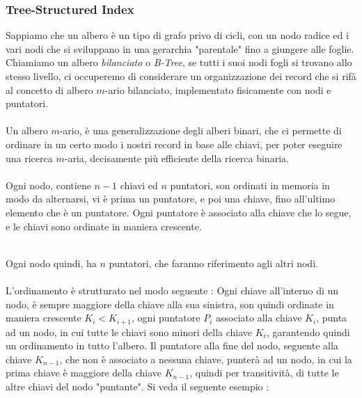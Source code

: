 \documentclass[12pt, letterpaper]{article}
\newcommand{\acc}{\\\hphantom{}\\}
\begin{document}
\subsubsection{Tree-Structured Index}
Sappiamo che un albero è un tipo di grafo privo di cicli, con un nodo radice ed i vari nodi che si sviluppano in una 
gerarchia "parentale" fino a giungere alle foglie. Chiamiamo un albero \textit{bilanciato} o \textit{B-Tree}, se tutti i suoi nodi fogli 
si trovano allo stesso livello, ci occuperemo di considerare un organizzazione dei record che si rifà al concetto 
di albero \(m\)-ario bilanciato, implementato fisicamente con nodi e puntatori.\acc 
Un albero \(m\)-ario, è una generalizzazione degli alberi binari, che ci permette di ordinare in un certo modo i nostri
 record in base alle chiavi, per poter eseguire una ricerca \(m\)-aria, decisamente più efficiente della ricerca binaria.\acc 
 Ogni nodo, contiene \(n-1\) chiavi ed \(n\) puntatori, son ordinati in memoria in modo da alternarsi, vi è prima un puntatore, 
e poi una chiave, fino all'ultimo elemento che è un puntatore. Ogni puntatore è associato alla chiave che lo segue, e le 
chiavi sono ordinate in maniera crescente.
\begin{figure}[h]
\end{figure}\\
Ogni nodo quindi, ha \(n\) puntatori, che faranno riferimento agli altri nodi. \acc L'ordinamento è strutturato nel modo 
seguente : Ogni chiave all'interno di un nodo, è sempre maggiore della chiave alla sua sinistra, son quindi ordinate 
in maniera crescente \(K_i<K_{i+1}\), ogni puntatore \(P_i\) associato alla chiave \(K_i\), punta ad un nodo, in cui 
tutte le chiavi sono minori della chiave \(K_i\), garantendo quindi un ordinamento in tutto l'albero. Il puntatore 
alla fine del nodo, seguente alla chiave \(K_{n-1}\), che non è associato a nessuna chiave, punterà ad un nodo, in cui la prima chiave è maggiore 
della chiave \(K_{n-1}\), quindi per transitività, di tutte le altre chiavi del nodo "puntante". Si veda il seguente esempio :
\begin{figure}[h]
\end{figure}\\
\end{document}
